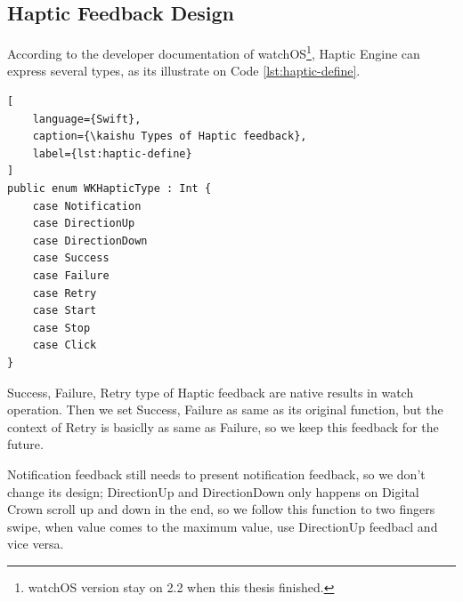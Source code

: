 \subsection{Haptic Feedback Design}

According to the developer documentation of watchOS\footnote{watchOS version stay on 2.2 when this thesis finished.}, Haptic Engine can express several types, as its illustrate on Code \ref{lst:haptic-define}.

\begin{lstlisting}[
    language={Swift},
    caption={\kaishu Types of Haptic feedback},
    label={lst:haptic-define}
]
public enum WKHapticType : Int {
    case Notification
    case DirectionUp
    case DirectionDown
    case Success
    case Failure
    case Retry
    case Start
    case Stop
    case Click
}
\end{lstlisting}

Success, Failure, Retry type of Haptic feedback are native results in watch operation.
Then we set Success, Failure as same as its original function, but the context of Retry is basiclly as same as Failure, so we keep this feedback for the future.

Notification feedback still needs to present notification feedback, so we don't change its design; DirectionUp and DirectionDown only happens on Digital Crown scroll up and down in the end, so we follow this function to two fingers swipe, when value comes to the maximum value, use DirectionUp feedbacl and  vice versa.

